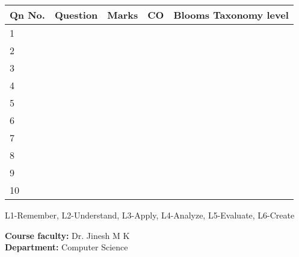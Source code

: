 \documentclass[12pt,a4paper]{article}
\begin{document}
\begin{longtable}{|p{}|p{}|p{}|p{}|p{}|}

\hline
\textbf{Qn No.}&\textbf{Question} &	\textbf{Marks}&\textbf{CO} &	\textbf{Blooms Taxonomy level} \\ \hline

1&&&&\\ \hline
2&&&&\\ \hline
3&&&&\\ \hline
4&&&&\\ \hline
5&&&&\\ \hline
6&&&&\\ \hline
7&&&&\\ \hline
8&&&&\\ \hline
9&&&&\\ \hline
10&&&&\\ \hline

\end{longtable}
L1-Remember, L2-Understand, L3-Apply, L4-Analyze, L5-Evaluate, L6-Create
\vspace{1em}


\noindent\textbf{Course faculty:} Dr. Jinesh M K \\
\textbf{Department:} Computer Science 
\end{document}
